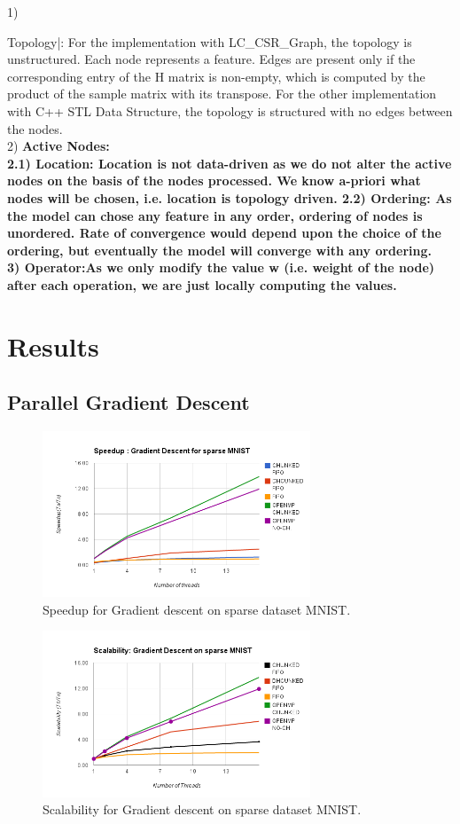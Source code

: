 \documentclass{sigplanconf}
\begin{document}
1) \bf{Topology|: \rm For the implementation with LC\_CSR\_Graph, the topology is unstructured. Each node represents a feature. Edges are present only if the corresponding entry of the H matrix is non-empty, which is computed by the product of the sample matrix with its transpose. For the other implementation with C++ STL Data Structure, the topology is structured with no edges between the nodes.\\
2) \bf{Active Nodes}:\rm \\
2.1) \bf{Location}: \rm Location is not data-driven as we do not alter the active nodes on the basis of the
nodes processed. We know a-priori what nodes will be chosen, i.e. location is topology driven.
2.2) Ordering: As the model can chose any feature in any order, ordering of nodes is unordered. Rate
of convergence would depend upon the choice of the ordering, but eventually the model will converge
with any ordering. \\
3) \bf{ Operator}:\rm As we only modify the value w (i.e. weight of the node) after each operation, we are just
locally computing the values.\\

\section{Results}


\subsection{Parallel Gradient Descent}	

\begin{figure}[ht!]
\centering
\includegraphics[width=80mm]{gd_speed_sparse.png}
\caption{Speedup for Gradient descent on sparse dataset MNIST. }
\label{fig:sp_gd_mnist}
\end{figure}


\begin{figure}[ht!]
\centering
\includegraphics[width=80mm]{gd_scale_sparse.png}
\caption{Scalability for Gradient descent on sparse dataset MNIST. }
\label{fig:sc_gd_mnist}
\end{figure}

}
\end{document}
